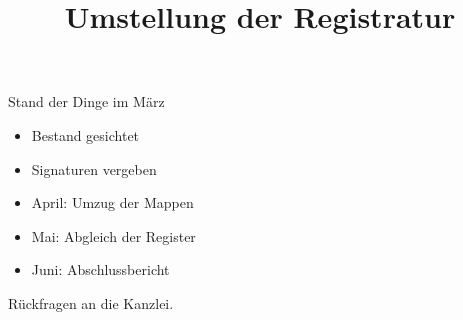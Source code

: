 \documentclass[11pt,a4paper]{article}
\title{Umstellung der Registratur}
\begin{document}
\maketitle

Stand der Dinge im März

\begin{itemize}
\item Bestand gesichtet
\item Signaturen vergeben
\end{itemize}

\begin{itemize}
\item April: Umzug der Mappen
\item Mai: Abgleich der Register
\item Juni: Abschlussbericht
\end{itemize}

Rückfragen an die Kanzlei.
\end{document}
